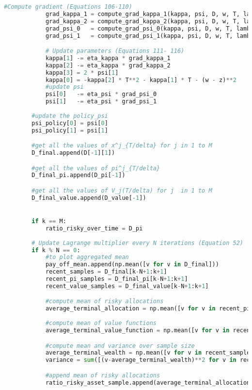 \documentclass[oneside, a4paper, onecolumn, 11pt]{article}
\begin{document}
\begin{lstlisting}[language=Python, caption=EMV Portfolio Selection Algorithm, label=code:emv]
            #Compute gradient (Equations 106-110)
            grad_kappa_1 = compute_grad_kappa_1(kappa, psi, D, w, T, lamb, delta_t)
            grad_kappa_2 = compute_grad_kappa_2(kappa, psi, D, w, T, lamb, delta_t)
            grad_psi_0   = compute_grad_psi_0(kappa, psi, D, w, T, lamb, delta_t)
            grad_psi_1   = compute_grad_psi_1(kappa, psi, D, w, T, lamb, delta_t)

            # Update parameters (Equations 111- 116)
            kappa[1] -= eta_kappa * grad_kappa_1
            kappa[2] -= eta_kappa * grad_kappa_2
            kappa[3] = 2 * psi[1]      
            kappa[0] = -kappa[2] * T**2 - kappa[1] * T - (w - z)**2
            #update psi
            psi[0]   -= eta_psi * grad_psi_0
            psi[1]   -= eta_psi * grad_psi_1
        
        #update the policy_psi
        psi_policy[0] = psi[0]
        psi_policy[1] = psi[1]

        #get all the values of x^j_{T/delta} for j in 1 to M 
        D_final.append(D[-1][1]) 

        #get all the values of pi^j_{T/delta}    
        D_final_pi.append(D_pi[-1])

        #get all the values of V_j(T/delta) for j  in 1 to M 
        D_final_value.append(D_value[-1])


        if k == M: 
            ratio_risky_over_time = D_pi
            
        # Update Lagrange multiplier every N iterations (Equation 52)
        if k % N == 0:
            #to plot aggregated mean
            pay_off_mean.append(np.mean([v for v in D_final]))
            recent_samples = D_final[k-N+1:k+1] 
            recent_pi_samples = D_final_pi[k-N+1:k+1]
            recent_value_samples = D_final_value[k-N+1:k+1]

            #compute mean of risky allocations 
            average_terminal_allocation = np.mean([v for v in recent_pi_samples])
        
            #compute mean of value functions 
            average_terminal_value_function = np.mean([v for v in recent_value_samples])

            #compute mean and variance over sample size 
            average_terminal_wealth = np.mean([v for v in recent_samples])
            variance = sum([(v-average_terminal_wealth)**2 for v in recent_samples])

            #append mean of risky allocations
            ratio_risky_asset_sample.append(average_terminal_allocation)


\end{lstlisting}
\end{document}
